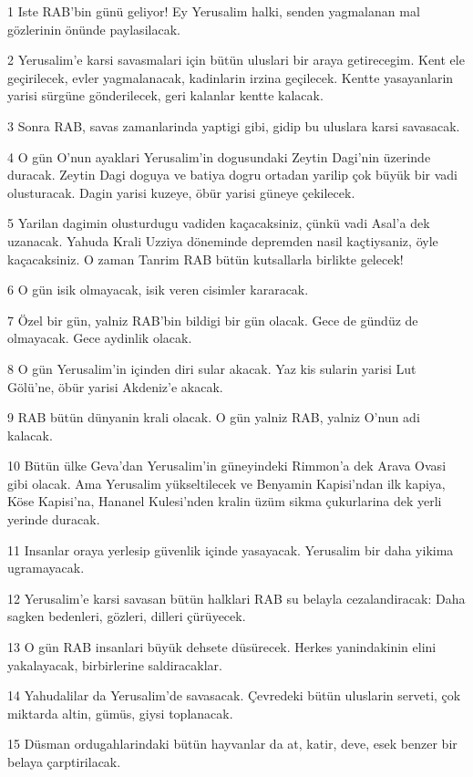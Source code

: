 \par 1 Iste RAB'bin günü geliyor! Ey Yerusalim halki, senden yagmalanan mal gözlerinin önünde paylasilacak.
\par 2 Yerusalim'e karsi savasmalari için bütün uluslari bir araya getirecegim. Kent ele geçirilecek, evler yagmalanacak, kadinlarin irzina geçilecek. Kentte yasayanlarin yarisi sürgüne gönderilecek, geri kalanlar kentte kalacak.
\par 3 Sonra RAB, savas zamanlarinda yaptigi gibi, gidip bu uluslara karsi savasacak.
\par 4 O gün O'nun ayaklari Yerusalim'in dogusundaki Zeytin Dagi'nin üzerinde duracak. Zeytin Dagi doguya ve batiya dogru ortadan yarilip çok büyük bir vadi olusturacak. Dagin yarisi kuzeye, öbür yarisi güneye çekilecek.
\par 5 Yarilan dagimin olusturdugu vadiden kaçacaksiniz, çünkü vadi Asal'a dek uzanacak. Yahuda Krali Uzziya döneminde depremden nasil kaçtiysaniz, öyle kaçacaksiniz. O zaman Tanrim RAB bütün kutsallarla birlikte gelecek!
\par 6 O gün isik olmayacak, isik veren cisimler kararacak.
\par 7 Özel bir gün, yalniz RAB'bin bildigi bir gün olacak. Gece de gündüz de olmayacak. Gece aydinlik olacak.
\par 8 O gün Yerusalim'in içinden diri sular akacak. Yaz kis sularin yarisi Lut Gölü'ne, öbür yarisi Akdeniz'e akacak.
\par 9 RAB bütün dünyanin krali olacak. O gün yalniz RAB, yalniz O'nun adi kalacak.
\par 10 Bütün ülke Geva'dan Yerusalim'in güneyindeki Rimmon'a dek Arava Ovasi gibi olacak. Ama Yerusalim yükseltilecek ve Benyamin Kapisi'ndan ilk kapiya, Köse Kapisi'na, Hananel Kulesi'nden kralin üzüm sikma çukurlarina dek yerli yerinde duracak.
\par 11 Insanlar oraya yerlesip güvenlik içinde yasayacak. Yerusalim bir daha yikima ugramayacak.
\par 12 Yerusalim'e karsi savasan bütün halklari RAB su belayla cezalandiracak: Daha sagken bedenleri, gözleri, dilleri çürüyecek.
\par 13 O gün RAB insanlari büyük dehsete düsürecek. Herkes yanindakinin elini yakalayacak, birbirlerine saldiracaklar.
\par 14 Yahudalilar da Yerusalim'de savasacak. Çevredeki bütün uluslarin serveti, çok miktarda altin, gümüs, giysi toplanacak.
\par 15 Düsman ordugahlarindaki bütün hayvanlar da at, katir, deve, esek benzer bir belaya çarptirilacak.
